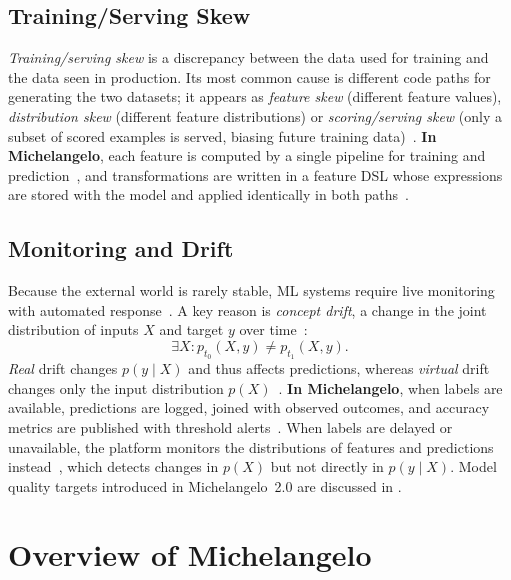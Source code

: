 \subsection{Training/Serving Skew}
\label{subsec:train-serve-skew}

\emph{Training/serving skew} is a discrepancy between the data used for
training and the data seen in production. Its most common cause is
different code paths for generating the two datasets; it appears as
\emph{feature skew} (different feature values), \emph{distribution skew}
(different feature distributions) or \emph{scoring/serving skew} (only a
subset of scored examples is served, biasing future training
data)~\cite{breck2019data}.
\textbf{In Michelangelo}, each feature is computed by a single pipeline
for training and prediction~\cite{li2017scaling}, and transformations
are written in a feature DSL whose expressions are stored with the model
and applied identically in both paths~\cite{delbalso2017meet}.

\subsection{Monitoring and Drift}
\label{subsec:monitoring-drift}

Because the external world is rarely stable, ML systems require live
monitoring with automated response~\cite{sculley2015hidden}. A key reason
is \emph{concept drift}, a change in the joint distribution of inputs $X$
and target $y$ over time~\cite{gama2014survey}:
\begin{equation}
  \exists X : p_{t_0}(X, y) \neq p_{t_1}(X, y).
  \label{eq:concept-drift}
\end{equation}
\emph{Real} drift changes $p(y \mid X)$ and thus affects predictions,
whereas \emph{virtual} drift changes only the input distribution
$p(X)$~\cite{gama2014survey}.
\textbf{In Michelangelo}, when labels are available, predictions are
logged, joined with observed outcomes, and accuracy metrics are published
with threshold alerts~\cite{delbalso2017meet,li2017scaling}. When labels
are delayed or unavailable, the platform monitors the distributions of
features and predictions instead~\cite{delbalso2018scaling}, which
detects changes in $p(X)$ but not directly in $p(y \mid X)$. Model
quality targets introduced in Michelangelo~2.0 are discussed in
.


\section{Overview of Michelangelo}
\label{sec:michelangelo-overview}

